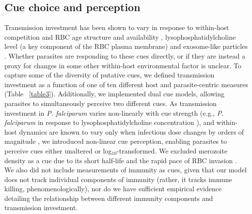 \documentclass[10pt,letterpaper]{article}
\begin{document}
\subsection*{Cue choice and perception}
Transmission investment has been shown to vary in response to within-host competition \cite{pollitt_competition_2011,cameron_plasticity_2013} and RBC age structure and availability \cite{trager_enhanced_1992, trager_plasmodium_1999, reece_host_2005, birget_phenotypic_2017, schneider_adaptive_2018}, lysophosphatidylcholine level (a key component of the RBC plasma membrane) and exosome-like particles \cite{brancucci_lysophosphatidylcholine_2017, regev-rudzki_cell-cell_2013}. Whether parasites are responding to these cues directly, or if they are instead a proxy for changes in some other within-host environmental factor is unclear. To capture some of the diversity of putative cues, we defined transmission investment as a function of one of ten different host and parasite-centric measures (Table ~\ref{table3}). Additionally, we implemented dual cue models, allowing parasites to simultaneously perceive two different cues. As transmission investment in \emph{P. falciparum} varies non-linearly with cue strength (e.g., \emph{P. falciparum} in response to lysophosphatidylcholine concentration \cite{brancucci_lysophosphatidylcholine_2017}), and within-host dynamics are known to vary only when infectious dose changes by orders of magnitude \cite{timms_effect_2001}, we introduced non-linear cue perception, enabling parasites to perceive cues either unaltered or log$_{10}$-transformed. We excluded merozoite density as a cue due to its short half-life and the rapid pace of RBC invasion \cite{boyle_isolation_2010}. We also did not include measurements of immunity as cues, given that our model does not track individual components of immunity (rather, it tracks immune killing, phenomenologically), nor do we have sufficient empirical evidence detailing the relationship between different immunity components and transmission investment.\newline 
\end{document}
